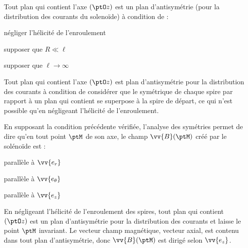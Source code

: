\debutEntrainement

\begin{enonce}
Tout plan qui contient l'axe $(\ptO z)$ est un plan d'antisymétrie (pour la distribution des courants du solenoïde) à condition de :
	\begin{listeQCM2Colonnes}
		\item négliger l'hélicité de l'enroulement
		\item supposer que $R \ll \ell$
		\item supposer que $\ell \to \infty$
	\end{listeQCM2Colonnes}
\minusSmallskip
\end{enonce}

\reponse{$\reponseA{}$}

\begin{corrige}
Tout plan qui contient l'axe $(\ptO z)$ est plan d'antisymétrie pour la distribution des courants à condition de considérer que le symétrique de chaque spire par rapport à un plan qui contient se superpose à la spire de départ, ce qui n'est possible qu'en négligeant l'hélicité de l'enroulement.
\end{corrige}




\begin{enonce}
En supposant la condition précédente vérifiée, l'analyse des symétries permet de dire qu'en tout point $\ptM$ de son axe, le champ $\vv{B}(\ptM)$ créé par le solénoïde est : 
	\begin{listeQCM3Colonnes}
		\item parallèle à $\vv{e_r}$
		\item parallèle à $\vv{e_\theta}$
		\item parallèle à $\vv{e_z}$
	\end{listeQCM3Colonnes}
\bigskip
\end{enonce}

\reponse{$\reponseC{}$}

\begin{corrige}
En négligeant l'hélicité de l'enroulement des spires, tout plan qui contient $(\ptO z)$ est un plan d'antisymétrie pour la distribution des courants et laisse le point $\ptM$ invariant. Le vecteur champ magnétique, vecteur axial, est contenu dans tout plan d'antisymétrie, donc $\vv{B}(\ptM)$ est dirigé selon $\vv{e_z}$. 
\end{corrige}

